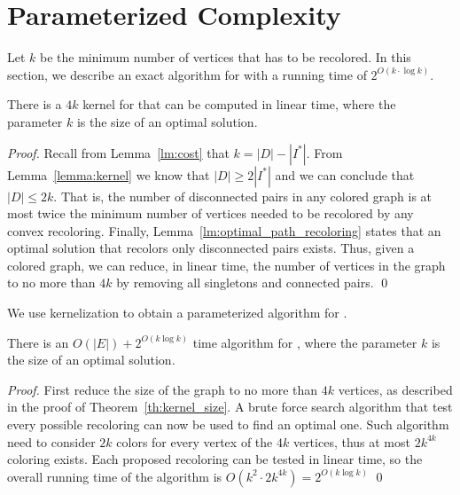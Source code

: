 \section{Parameterized Complexity}
\label{sec:fpt}

Let $k$ be the minimum number of vertices that has to be recolored. In this
section, we describe an exact algorithm for \TWOCR{} with a running time
of $2^{O(k\cdot \log{k})}$.

\begin{theorem}
\label{th:kernel_size}
There is a $4k$ kernel for \TWOCR{} that can be computed in linear time, where the
parameter $k$ is the size of an optimal solution.
\end{theorem}

\begin{proof}
	Recall from Lemma~\ref{lm:cost} that $k = |D| - |I^*|$.
	From Lemma~\ref{lemma:kernel} we know that $|D| \geq 2|I^*|$ and we can
	conclude that $|D| \leq 2k$.
	That is, the number of disconnected pairs in any colored graph is at most twice
	the minimum number of vertices needed to be recolored by any convex recoloring.
	Finally, Lemma~\ref{lm:optimal_path_recoloring} states that an optimal solution
	that recolors only disconnected pairs exists.
	Thus, given a colored graph, we can reduce, in linear time, the number of
	vertices in the graph to no more than $4k$ by removing all singletons and connected
	pairs.
\qed{}\end{proof}

We use kernelization to obtain a parameterized algorithm for \TWOCR{}.

\begin{theorem}
There is an $O(|E|) + 2^{O(k\log{k})}$ time algorithm for \TWOCR{}, where
the parameter $k$ is the size of an optimal solution.
\end{theorem}

\begin{proof}
	First reduce the size of the graph to no more than $4k$ vertices, as described
	in the proof of Theorem~\ref{th:kernel_size}.
	A brute force search algorithm
	that test every possible recoloring can now be used to find an optimal one.
	Such algorithm need to consider $2k$ colors for every vertex of the $4k$
	vertices, thus at most $2k^{4k}$ coloring exists. 
	Each proposed recoloring can be tested in linear time, so the overall running
	time of the algorithm is $O(k^2 \cdot 2k^{4k}) =  2^{O(k\log{k})}$
\qed{}\end{proof}

